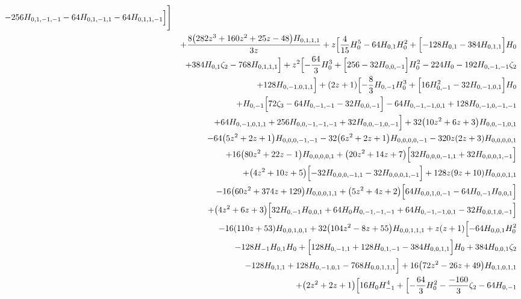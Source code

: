 \begin{eqnarray}
-256H_{0,1,-1,-1}
-64 H_{0,1,-1,1}-64H_{0,1,1,-1}\Bigr]\Biggr]
\nonumber \\ &&
+\frac{8 \big(282 z^3+160 z^2+25 z-48\big)  H_{0,1,1,1}}{3 z}
+z \Bigl[\frac{4}{15} H_0^5-64  H_{0,1}H_0^2
+\Bigl[-128  H_{0,1}
-384  H_{0,1,1}\Bigr] H_0
\nonumber \\ &&
+384 H_{0,1} \zeta_2
-768  H_{0,1,1,1}\Bigr]
+z^2 \Bigl[-\frac{64}{3} H_0^3+\Bigl[256 -32 H_{0,0,-1}\Bigr] H_0^2-224  H_0
-192 H_{0,-1,-1}\zeta_2
\nonumber \\ &&
+128  H_{0,-1,0,1,1}\Bigr]
+(2 z+1) \Bigl[-\frac{8}{3} H_{0,-1}H_0^3
+\Bigl[16 H_{0,-1}^2-32  H_{0,-1,0,1}\Bigr] H_0
\nonumber \\ &&
+H_{0,-1} \Bigl[72 \zeta_3-64 H_{0,-1,-1}-32 H_{0,0,-1}\Bigr]-64 H_{0,-1,-1,0,1}
+128H_{0,-1,0,-1,-1}
\nonumber \\ &&
+64 H_{0,-1,0,1,1}+256 H_{0,0,-1,-1,-1}+32H_{0,0,-1,0,-1}\Bigr]+32 \big(10 z^2+6 z+3\big) H_{0,0,-1,0,1}
\nonumber \\ &&
-64 \big(5 z^2+2z+1\big) H_{0,0,0,-1,-1}-32 \big(6 z^2+2 z+1\big) H_{0,0,0,0,-1}-320  z(2 z+3) H_{0,0,0,0,1}
\nonumber \\ &&
+16 \big(80 z^2+22 z-1\big) H_{0,0,0,0,1}+\big(20 z^2+14z+7\big) \Bigl[32 H_{0,0,0,-1,1}+32 H_{0,0,0,1,-1}\Bigr]
\nonumber \\ &&
+\big(4 z^2+10 z+5\big)\Bigl[-32  H_{0,0,0,-1,1}-32  H_{0,0,0,1,-1}\Bigr]+128  z (9z+10) H_{0,0,0,1,1}
\nonumber \\ &&
-16 \big(60 z^2+374 z+129\big) H_{0,0,0,1,1}+\big(5 z^2+4z+2\big) \Bigl[64 H_{0,0,1,0,-1}-64 H_{0,-1} H_{0,0,1}\Bigr]
\nonumber \\ &&
+\big(4 z^2+6z+3\big) \Bigl[32  H_{0,-1} H_{0,0,1}+64 H_0 H_{0,-1,-1,-1}+64 H_{0,-1,-1,0,1}-32  H_{0,0,1,0,-1}\Bigr]
\nonumber \\ &&
-16 (110 z+53) H_{0,0,1,0,1}+32\big(104 z^2-8 z+55\big) H_{0,0,1,1,1}+z (z+1) \Bigl[-64  H_{0,0,1}H_0^2
\nonumber \\ &&
-128 H_{-1} H_{0,1} H_0+\Bigl[128 H_{0,-1,1}+128 H_{0,1,-1}-384 H_{0,0,1,1}\Bigr] H_0+384  H_{0,0,1} \zeta_2
\nonumber \\ &&
-128 H_{0,1,1}+128  H_{0,-1,0,1}-768  H_{0,0,1,1,1}\Bigr]+16 \big(72z^2-26 z+49\big) H_{0,1,0,1,1}
\nonumber \\ &&
+\big(2 z^2+2 z+1\big) \Bigl[16 H_0H_{-1}^4+\Bigl[-\frac{64}{3} H_0^2-\frac{-160}{3}\zeta_2-64 H_{0,-1}

\end{eqnarray}
